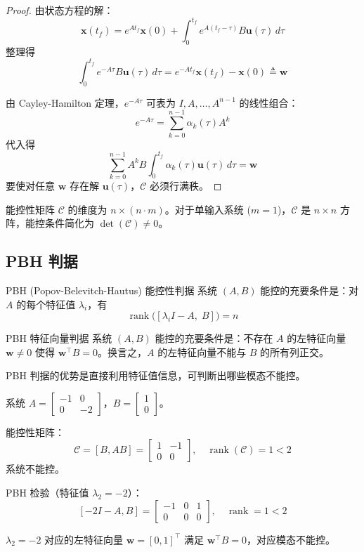 \begin{proof}
由状态方程的解：
\[
\mathbf{x}(t_f) = e^{At_f}\mathbf{x}(0) + \int_0^{t_f} e^{A(t_f - \tau)} B\mathbf{u}(\tau)\,d\tau
\]
整理得
\[
\int_0^{t_f} e^{-A\tau} B\mathbf{u}(\tau)\,d\tau = e^{-At_f}\mathbf{x}(t_f) - \mathbf{x}(0) \triangleq \mathbf{w}
\]

由 Cayley-Hamilton 定理，$e^{-A\tau}$ 可表为 $I, A, \ldots, A^{n-1}$ 的线性组合：
\[
e^{-A\tau} = \sum_{k=0}^{n-1} \alpha_k(\tau) A^k
\]
代入得
\[
\sum_{k=0}^{n-1} A^k B \int_0^{t_f} \alpha_k(\tau)\mathbf{u}(\tau)\,d\tau = \mathbf{w}
\]
要使对任意 $\mathbf{w}$ 存在解 $\mathbf{u}(\tau)$，$\mathcal{C}$ 必须行满秩。
\end{proof}

能控性矩阵 $\mathcal{C}$ 的维度为 $n \times (n \cdot m)$。对于单输入系统 ($m=1$)，$\mathcal{C}$ 是 $n \times n$ 方阵，能控条件简化为 $\det(\mathcal{C}) \neq 0$。

\subsection{PBH 判据}

\begin{myTheorem}{PBH (Popov-Belevitch-Hautus) 能控性判据}
系统 $(A, B)$ 能控的充要条件是：对 $A$ 的每个特征值 $\lambda_i$，有
\[
\operatorname{rank}\bigl([\lambda_i I - A,\; B]\bigr) = n
\]
\end{myTheorem}

\begin{myTheorem}{PBH 特征向量判据}
系统 $(A, B)$ 能控的充要条件是：不存在 $A$ 的左特征向量 $\mathbf{w} \neq 0$ 使得 $\mathbf{w}^{\top} B = 0$。换言之，$A$ 的左特征向量不能与 $B$ 的所有列正交。
\end{myTheorem}

PBH 判据的优势是直接利用特征值信息，可判断出哪些模态不能控。

\begin{example}
系统 $A = \begin{bmatrix} -1 & 0 \\ 0 & -2 \end{bmatrix}$，$B = \begin{bmatrix} 1 \\ 0 \end{bmatrix}$。

能控性矩阵：
\[
\mathcal{C} = [B, AB] = \begin{bmatrix} 1 & -1 \\ 0 & 0 \end{bmatrix},\quad
\operatorname{rank}(\mathcal{C}) = 1 < 2
\]
系统不能控。

PBH 检验（特征值 $\lambda_2 = -2$）：
\[
[-2I - A, B] = \begin{bmatrix} -1 & 0 & 1 \\ 0 & 0 & 0 \end{bmatrix},\quad
\operatorname{rank} = 1 < 2
\]

$\lambda_2 = -2$ 对应的左特征向量 $\mathbf{w} = [0, 1]^{\top}$ 满足 $\mathbf{w}^{\top} B = 0$，对应模态不能控。
\end{example}

